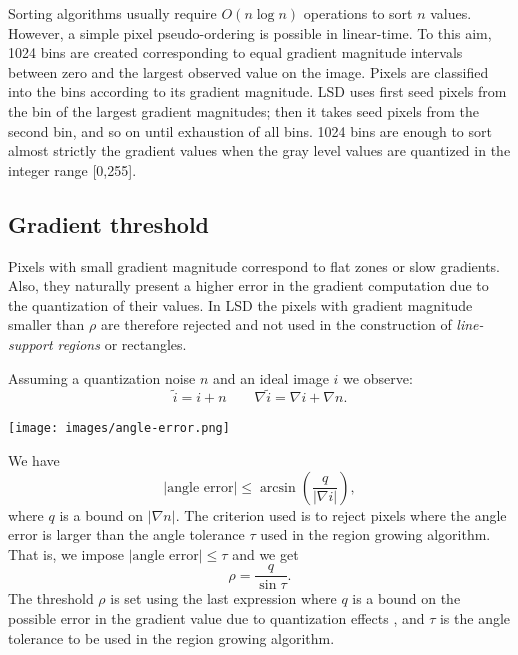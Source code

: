 \documentclass{ipol}
\begin{document}
Sorting algorithms usually require $O(n\log n)$ operations to sort $n$
values. However, a simple pixel pseudo-ordering is possible in
linear-time. To this aim, 1024 bins are created corresponding to equal
gradient magnitude intervals between zero and the largest observed
value on the image. Pixels are classified into the bins according to
its gradient magnitude. LSD uses first seed pixels from the bin of the
largest gradient magnitudes; then it takes seed pixels from the second
bin, and so on until exhaustion of all bins. 1024 bins are enough to
sort almost strictly the gradient values when the gray level values
are quantized in the integer range [0,255].


\subsection{Gradient threshold}

Pixels with small gradient magnitude correspond to flat zones or slow
gradients. Also, they naturally present a higher error in the gradient
computation due to the quantization of their values. In LSD the pixels
with gradient magnitude smaller than $\rho$ are therefore rejected and
not used in the construction of \emph{line-support regions} or
rectangles.

Assuming a quantization noise $n$ and an ideal image $i$ we observe:
$$
   \tilde{i} = i + n \qquad \nabla\tilde{i} = \nabla i + \nabla n.
$$

\begin{center}
\texttt{[image: images/angle-error.png]}
\end{center}

We have
$$
   |\textrm{angle error}| \leq \arcsin\left(\frac{q}{|\nabla i|}\right),
$$
where $q$ is a bound on $|\nabla n|$. The criterion used is to reject
pixels where the angle error is larger than the angle tolerance $\tau$
used in the region growing algorithm. That is, we impose
$|\textrm{angle error}|\leq\tau$ and we get
$$
   \rho = \frac{q}{\sin{\tau}}.
$$
The threshold $\rho$ is set using the last expression where $q$ is a
bound on the possible error in the gradient value due to quantization
effects \cite{lsd}, and $\tau$ is the angle tolerance to be used in
the region growing algorithm.
\end{document}
